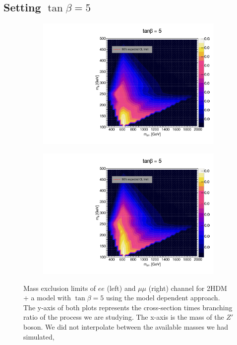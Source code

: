 \documentclass[12pt, a4paper]{book}
\begin{document}
\subsection{Setting $\tan\beta=5$}
\begin{figure}[!ht]
	\centering
   \begin{subfigure}[b]{0.49\textwidth}
      \centering
      \includegraphics[width=1\textwidth]{Limits/2HDM/2HDM_ee_tb5.pdf}
      \end{subfigure}
   \hfill
   \begin{subfigure}[b]{0.49\textwidth}
      \centering
      \includegraphics[width=1\textwidth]{Limits/2HDM/2HDM_uu_tb5.pdf}
      \end{subfigure}
   \caption[Expected mass exclusion limits of $ee$ and $\mu\mu$ channel for 2HDM + a model with $\tan\beta=5$ using the model dependent approach]{Mass exclusion limits of $ee$ (left) and $\mu\mu$ (right) channel for 2HDM + a model with $\tan\beta=5$ using the model dependent approach. The y-axis of both plots represents the cross-section times branching ratio of the process we are studying. The x-axis is the mass of the $Z'$ boson. We did not interpolate between the available masses we had simulated, 
}
\end{figure}
\end{document}
